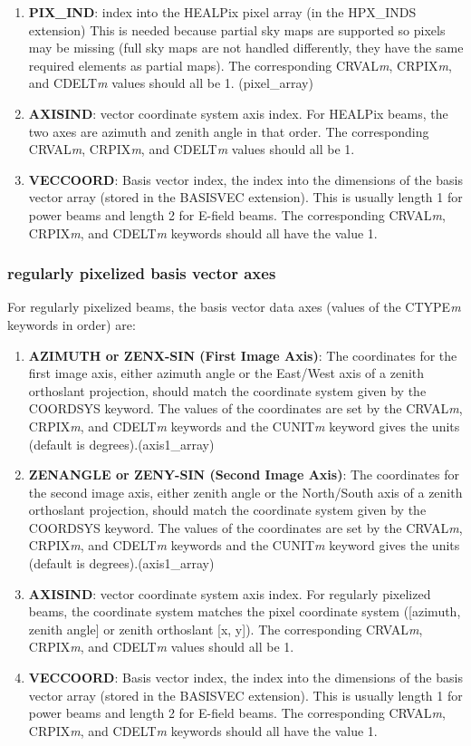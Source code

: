 \documentclass[11pt, oneside]{article}   	%
\begin{document}
\begin{enumerate}
\item{\textbf{PIX\_IND}: index into the HEALPix pixel array (in the HPX\_INDS extension) This is needed because partial sky maps are supported so pixels may be missing (full sky maps are not handled differently, they have the same required elements as partial maps). The corresponding CRVAL\textit{m}, CRPIX\textit{m}, and CDELT\textit{m} values should all be 1. (pixel\_array)}
\item{\textbf{AXISIND}: vector coordinate system axis index. For HEALPix beams, the two axes are azimuth and zenith angle in that order.  The corresponding CRVAL\textit{m}, CRPIX\textit{m}, and CDELT\textit{m} values should all be 1. }
\item{\textbf{VECCOORD}: Basis vector index, the index into the dimensions of the basis vector array (stored in the BASISVEC extension). This is usually length 1 for power beams and length 2 for E-field beams. The corresponding CRVAL\textit{m}, CRPIX\textit{m}, and CDELT\textit{m} keywords should all have the value 1.}
\end{enumerate}

\subsubsection{regularly pixelized basis vector axes}
For regularly pixelized beams, the basis vector data axes (values of the CTYPE\textit{m} keywords in order) are:

\begin{enumerate}
\item{\textbf{AZIMUTH or ZENX-SIN (First Image Axis)}: The coordinates for the first image axis, either azimuth angle or the East/West axis of a zenith orthoslant projection, should match the coordinate system given by the COORDSYS keyword. The values of the coordinates are set by the CRVAL\textit{m}, CRPIX\textit{m}, and CDELT\textit{m} keywords and the CUNIT\textit{m} keyword gives the units (default is degrees).(axis1\_array)}
\item{\textbf{ZENANGLE or ZENY-SIN (Second Image Axis)}: The coordinates for the second image axis, either zenith angle or the North/South axis of a zenith orthoslant projection, should match the coordinate system given by the COORDSYS keyword. The values of the coordinates are set by the CRVAL\textit{m}, CRPIX\textit{m}, and CDELT\textit{m} keywords and the CUNIT\textit{m} keyword gives the units (default is degrees).(axis1\_array)}
\item{\textbf{AXISIND}: vector coordinate system axis index. For regularly pixelized beams, the coordinate system matches the pixel coordinate system ([azimuth, zenith angle] or zenith orthoslant [x, y]). The corresponding CRVAL\textit{m}, CRPIX\textit{m}, and CDELT\textit{m} values should all be 1.}
\item{\textbf{VECCOORD}: Basis vector index, the index into the dimensions of the basis vector array (stored in the BASISVEC extension). This is usually length 1 for power beams and length 2 for E-field beams. The corresponding CRVAL\textit{m}, CRPIX\textit{m}, and CDELT\textit{m} keywords should all have the value 1.}
\end{enumerate}
\end{document}
